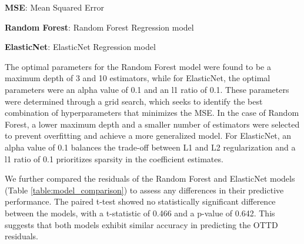 \documentclass[11pt]{article}
\begin{document}
\begin{table}[h]
\caption{Performance metrics of the Random Forest and ElasticNet models}
\label{table:model_performance}
\begin{threeparttable}
\renewcommand{\TPTminimum}{\linewidth}
\begin{tablenotes}
\footnotesize
\item \textbf{MSE}: Mean Squared Error
\item \textbf{Random Forest}: Random Forest Regression model
\item \textbf{ElasticNet}: ElasticNet Regression model
\end{tablenotes}
\end{threeparttable}
\end{table}


The optimal parameters for the Random Forest model were found to be a maximum depth of 3 and 10 estimators, while for ElasticNet, the optimal parameters were an alpha value of 0.1 and an l1 ratio of 0.1. These parameters were determined through a grid search, which seeks to identify the best combination of hyperparameters that minimizes the MSE. In the case of Random Forest, a lower maximum depth and a smaller number of estimators were selected to prevent overfitting and achieve a more generalized model. For ElasticNet, an alpha value of 0.1 balances the trade-off between L1 and L2 regularization and a l1 ratio of 0.1 prioritizes sparsity in the coefficient estimates.

We further compared the residuals of the Random Forest and ElasticNet models (Table {}\ref{table:model_comparison}) to assess any differences in their predictive performance. The paired t-test showed no statistically significant difference between the models, with a t-statistic of 0.466 and a p-value of 0.642. This suggests that both models exhibit similar accuracy in predicting the OTTD residuals.
\end{document}
